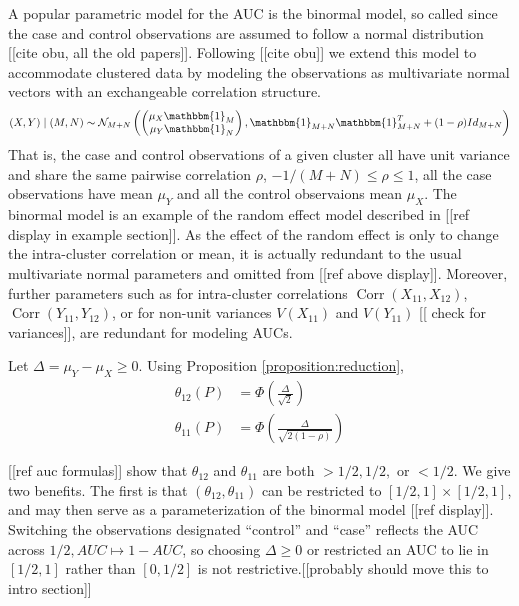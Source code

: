 \message{ !name(manuscript.tex)}\documentclass[12pt]{article}
\DeclareMathOperator{\AUC}{AUC}
\DeclareMathOperator{\V}{Var}
\DeclareMathOperator{\corr}{Corr}
\newcommand{\cind}{\perp \!\!\! \perp}
\newcommand{\aucindiv}{\theta_{11}}%
\newcommand{\aucpop}{\theta_{12}}%
\renewcommand{\V}{V}
\begin{document}
A popular parametric model for the AUC is the binormal model, so
called since the case and control observations are assumed to follow a
normal distribution [[cite obu, all the old papers]]. Following [[cite
obu]] we extend this model to accommodate clustered data by modeling
the observations as multivariate normal vectors with an exchangeable
correlation structure.
\begin{align}
  (X,Y) \mid (M,N) \sim \mathcal{N}_{M+N}\left(
  \begin{pmatrix}\mu_X\mathbbm{1}_M\\ \mu_Y\mathbbm{1}_N\end{pmatrix},
  \mathbbm{1}_{M+N}\mathbbm{1}_{M+N}^T + (1-\rho)Id_{M+N}
  \right)
\end{align}
That is, the case and control observations of a given cluster all have
unit variance and share the same pairwise correlation $\rho$, $-1/(M+N)\le\rho\le 1$, all the case observations have mean $\mu_Y$ and all the
control observaions mean $\mu_X$. The binormal model is an example of
the random effect model described in [[ref display in example
section]]. As the effect of the random effect is only to change the
intra-cluster correlation or mean, it is actually redundant to the
usual multivariate normal
parameters and omitted from [[ref above display]]. %
Moreover, further parameters such as for intra-cluster correlations
$\corr(X_{11},X_{12})$, $\corr(Y_{11},Y_{12})$, or for non-unit
variances $\V(X_11)$ and $\V(Y_11)$ [[ check for variances]], are
redundant for modeling AUCs.

Let $\Delta=\mu_Y-\mu_X\ge 0$. Using Proposition \ref{proposition:reduction},
\begin{align}
  \aucpop(P) &= \Phi\left(\frac{\Delta}{\sqrt{2}}\right)\\
  \aucindiv(P) &=  \Phi\left(\frac{\Delta}{\sqrt{2(1-\rho)}}\right)
\end{align}

[[ref auc formulas]] show that $\aucpop$ and $\aucindiv$ are both
$>1/2, 1/2,$ or $<1/2$. We give two benefits. The first is that
$(\aucpop,\aucindiv)$ can be restricted to $[1/2,1]\times[1/2,1]$, and
may then serve as a parameterization of the binormal model [[ref
display]]. Switching the observations designated ``control'' and
``case'' reflects the AUC across $1/2, AUC\mapsto 1-AUC$, so choosing
$\Delta\ge 0$ or restricted an AUC to lie in $[1/2,1]$ rather than
$[0,1/2]$ is not restrictive.[[probably should move this to intro section]]
\end{document}
